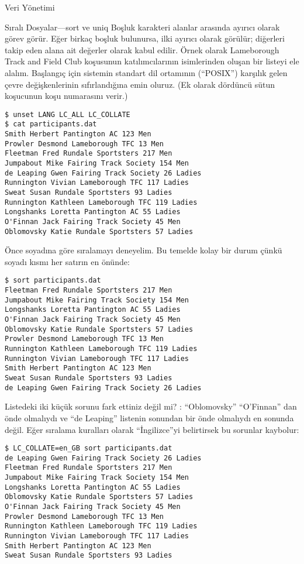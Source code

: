 \begin{section}{Veri Yönetimi}
\begin{subsection}{Sıralı Dosyalar—sort ve uniq}
Boşluk karakteri alanlar arasında ayırıcı olarak görev görür. Eğer birkaç boşluk bulunursa, ilki ayırıcı olarak görülür; diğerleri takip eden alana ait değerler olarak kabul edilir. Örnek olarak Lameborough Track and Field Club  koşusunun katılımcılarının isimlerinden oluşan bir listeyi ele alalım. Başlangıç için  sistemin standart dil ortamının (“POSIX”) karşılık gelen çevre değişkenlerinin sıfırlandığına emin oluruz. (Ek olarak dördüncü sütun koşucunun koşu numarasını verir.)
\footnotesize  
\begin{verbatim}
$ unset LANG LC_ALL LC_COLLATE
$ cat participants.dat
Smith Herbert Pantington AC 123 Men
Prowler Desmond Lameborough TFC 13 Men
Fleetman Fred Rundale Sportsters 217 Men
Jumpabout Mike Fairing Track Society 154 Men
de Leaping Gwen Fairing Track Society 26 Ladies
Runnington Vivian Lameborough TFC 117 Ladies
Sweat Susan Rundale Sportsters 93 Ladies
Runnington Kathleen Lameborough TFC 119 Ladies
Longshanks Loretta Pantington AC 55 Ladies
O'Finnan Jack Fairing Track Society 45 Men
Oblomovsky Katie Rundale Sportsters 57 Ladies
\end{verbatim}
\normalsize

Önce soyadına göre sıralamayı deneyelim. Bu temelde kolay bir durum çünkü soyadı kısmı her satırın en önünde:
\footnotesize
\begin{verbatim}
$ sort participants.dat
Fleetman Fred Rundale Sportsters 217 Men
Jumpabout Mike Fairing Track Society 154 Men
Longshanks Loretta Pantington AC 55 Ladies
O'Finnan Jack Fairing Track Society 45 Men
Oblomovsky Katie Rundale Sportsters 57 Ladies
Prowler Desmond Lameborough TFC 13 Men
Runnington Kathleen Lameborough TFC 119 Ladies
Runnington Vivian Lameborough TFC 117 Ladies
Smith Herbert Pantington AC 123 Men
Sweat Susan Rundale Sportsters 93 Ladies
de Leaping Gwen Fairing Track Society 26 Ladies
\end{verbatim}
\normalsize

Listedeki iki küçük sorunu fark ettiniz değil mi? : “Oblomovsky” “O’Finnan” dan önde olmalıydı ve “de Leaping” listenin sonundan bir önde olmalıydı en sonunda değil.  Eğer sıralama kuralları olarak “İngilizce”yi belirtirsek bu sorunlar kaybolur:
\footnotesize
\begin{verbatim}
$ LC_COLLATE=en_GB sort participants.dat
de Leaping Gwen Fairing Track Society 26 Ladies
Fleetman Fred Rundale Sportsters 217 Men
Jumpabout Mike Fairing Track Society 154 Men
Longshanks Loretta Pantington AC 55 Ladies
Oblomovsky Katie Rundale Sportsters 57 Ladies
O'Finnan Jack Fairing Track Society 45 Men
Prowler Desmond Lameborough TFC 13 Men
Runnington Kathleen Lameborough TFC 119 Ladies
Runnington Vivian Lameborough TFC 117 Ladies
Smith Herbert Pantington AC 123 Men
Sweat Susan Rundale Sportsters 93 Ladies
\end{verbatim}
\normalsize


\end{subsection}
\end{section}
